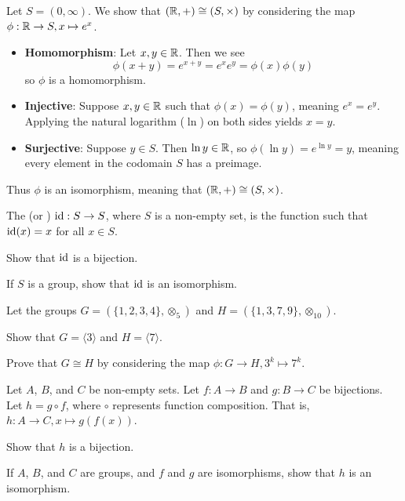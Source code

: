 \begin{example}
    Let $S = (0,\infty)$. We show that $(\mathbb{R}, +) \cong (S, \times)$ by considering the map $\phi: \mathbb{R} \to S, x \mapsto e^x$.
    \begin{itemize}
        \item \textbf{Homomorphism}: Let $x, y \in \mathbb{R}$. Then we see
        \[
            \phi(x+y) = e^{x+y} = e^xe^y = \phi(x)\phi(y)
        \]
        so $\phi$ is a homomorphism.

        \item \textbf{Injective}: Suppose $x, y \in \mathbb{R}$ such that $\phi(x) = \phi(y)$, meaning $e^x = e^y$. Applying the natural logarithm ($\ln$) on both sides yields $x = y$.

        \item \textbf{Surjective}: Suppose $y \in S$. Then $\ln y \in \mathbb{R}$, so $\phi(\ln y) = e^{\ln y} = y$, meaning every element in the codomain $S$ has a preimage.
    \end{itemize}

    Thus $\phi$ is an isomorphism, meaning that $(\mathbb{R}, +) \cong (S, \times)$.
\end{example}

\begin{exercise}\label{exercise-identity-map-is-isomorphism}
    The  (or ) $\mathrm{id}: S \to S$, where $S$ is a non-empty set, is the function such that $\mathrm{id}(x) = x$ for all $x \in S$.
    \begin{partquestions}{\roman*}
        \item Show that $\mathrm{id}$ is a bijection.
        \item If $S$ is a group, show that $\mathrm{id}$ is an isomorphism.
    \end{partquestions}
\end{exercise}
\begin{exercise}
    Let the groups $G = (\{1, 2, 3, 4\}, \otimes_5)$ and $H = (\{1, 3, 7, 9\}, \otimes_{10})$.
    \begin{partquestions}{\roman*}
        \item Show that $G = \langle 3 \rangle$ and $H = \langle 7 \rangle$.
        \item Prove that $G \cong H$ by considering the map $\phi: G \to H, 3^k \mapsto 7^k$.
    \end{partquestions}
\end{exercise}
\begin{exercise}\label{exercise-composition-of-isomorphisms-is-isomorphisms}
    Let $A$, $B$, and $C$ be non-empty sets. Let $f: A \to B$ and $g: B \to C$ be bijections. Let $h = g\circ f$, where $\circ$ represents function composition. That is, $h: A \to C, x \mapsto g(f(x))$.
    \begin{partquestions}{\roman*}
        \item Show that $h$ is a bijection.
        \item If $A$, $B$, and $C$ are groups, and $f$ and $g$ are isomorphisms, show that $h$ is an isomorphism.
    \end{partquestions}
\end{exercise}

